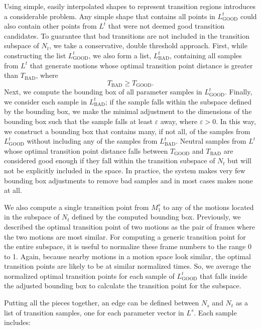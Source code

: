 \documentclass[10pt,twocolumn]{article}
\begin{document}
Using simple, easily interpolated shapes to represent transition regions introduces a considerable problem. Any simple shape that contains all points in $L_{\mathrm{GOOD}}^t$ could also contain other points from $L^t$ that were not deemed good transition candidates. To guarantee that bad transitions are not included in the transition subspace of $N_t$, we take a conservative, double threshold approach. First, while constructing the list $L_{\mathrm{GOOD}}^t$, we also form a list, $L_{\mathrm{BAD}}^t$, containing all samples from $L^t$ that generate motions whose optimal transition point distance is greater than $T_{\mathrm{BAD}}$, where
\[
T_{\mathrm{BAD}} \geq T_{\mathrm{GOOD}}.
\]
Next, we compute the bounding box of all parameter samples in $L_{\mathrm{GOOD}}^t$. Finally, we consider each sample in $L_{\mathrm{BAD}}^t$; if the sample falls within the subspace defined by the bounding box, we make the minimal adjustment to the dimensions of the bounding box such that the sample falls at least $\varepsilon$ away, where $\varepsilon > 0$. In this way, we construct a bounding box that contains many, if not all, of the samples from $L_{\mathrm{GOOD}}^t$ without including any of the samples from $L_{\mathrm{BAD}}^t$. Neutral samples from $L^t$ whose optimal transition point distance falls between $T_{\mathrm{GOOD}}$ and $T_{\mathrm{BAD}}$ are considered good enough if they fall within the transition subspace of $N_t$ but will not be explicitly included in the space. In practice, the system makes very few bounding box adjustments to remove bad samples and in most cases makes none at all.

We also compute a single transition point from $M_1^s$ to any of the motions located in the subspace of $N_t$ defined by the computed bounding box. Previously, we described the optimal transition point of two motions as the pair of frames where the two motions are most similar. For computing a generic transition point for the entire subspace, it is useful to normalize these frame numbers to the range 0 to 1. Again, because nearby motions in a motion space look similar, the optimal transition points are likely to be at similar normalized times. So, we average the normalized optimal transition points for each sample of $L_{\mathrm{GOOD}}^t$ that falls inside the adjusted bounding box to calculate the transition point for the subspace.

Putting all the pieces together, an edge can be defined between $N_s$ and $N_t$ as a list of transition samples, one for each parameter vector in $L^s$. Each sample includes:
\end{document}
